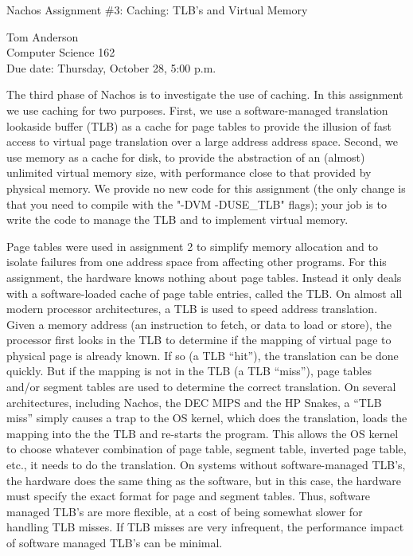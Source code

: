 


\begin{center}
{\large Nachos Assignment \#3: Caching: TLB's and Virtual Memory

\vspace{.2in}
Tom Anderson\\
Computer Science 162\\
Due date: Thursday, October 28, 5:00 p.m.
}
\end{center}

\vspace{.2in}

The third phase of Nachos is to investigate the use of caching.
In this assignment we use caching for two purposes.  First,
we use a software-managed translation lookaside buffer (TLB) as a cache
for page tables to provide the illusion of fast access to virtual page
translation over a large address address space.
Second, we use memory as a cache for disk,
to provide the abstraction of an (almost) unlimited virtual memory size,
with performance close to that provided by physical memory.
We provide no new code for this assignment (the only change is that
you need to compile with the "-DVM -DUSE\_TLB" flags); your job is
to write the code to manage the TLB and to implement virtual memory.

Page tables were used in assignment 2 to simplify memory
allocation and to isolate failures from one address space from
affecting other programs.  For this assignment, the hardware
knows nothing about page tables.  Instead it only deals with a software-loaded
cache of page table entries, called the TLB.
On almost all modern processor architectures, a TLB
is used to speed address translation.  Given a memory
address (an instruction to fetch, or data to load or store), the processor
first looks in the TLB to determine if the mapping of virtual page
to physical page is already known.  If so (a TLB ``hit''), the translation
can be done
quickly.  But if the mapping is not in the TLB (a TLB ``miss''), page tables
and/or segment tables are used to determine the correct translation.
On several architectures, including Nachos, the DEC MIPS and
the HP Snakes, a ``TLB miss'' simply causes a trap to the OS kernel,
which does the
translation, loads the mapping into the the TLB and re-starts the program.
This allows the OS kernel to choose whatever combination of page table,
segment table, inverted page table, etc., it needs to do the translation.
On systems without software-managed TLB's, the hardware does the same thing
as the software, but in this case, the hardware must specify the exact
format for page and segment tables.  Thus, software managed TLB's are
more flexible, at a cost of being somewhat slower for handling TLB misses.
If TLB misses are very infrequent, the performance impact of software managed
TLB's can be minimal.

